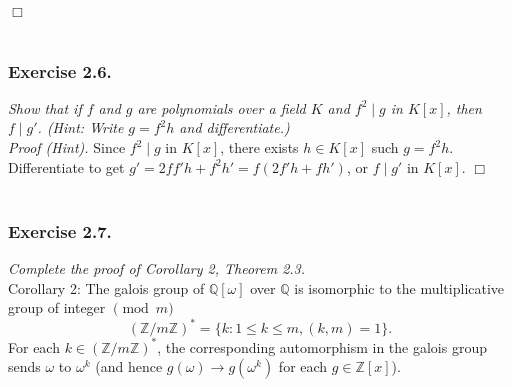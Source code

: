 \documentclass{article}
\begin{document}
$\Box$ \\\\






\subsubsection*{Exercise 2.6.}
\emph{Show that if $f$ and $g$ are polynomials over a field $K$ and
$f^2 \mid g$ in $K[x]$, then $f \mid g'$.
(Hint: Write $g = f^2 h$ and differentiate.)} \\

\emph{Proof (Hint).}
Since $f^2 \mid g$ in $K[x]$, there exists $h \in K[x]$ such $g = f^2 h$.
Differentiate to get $g' = 2f f' h + f^2 h' = f(2f'h + fh')$,
or $f \mid g'$ in $K[x]$.
$\Box$ \\\\






\subsubsection*{Exercise 2.7.}
\emph{Complete the proof of Corollary 2, Theorem 2.3.} \\



Corollary 2: The galois group of $\mathbb{Q}[\omega]$ over $\mathbb{Q}$ is isomorphic to
the multiplicative group of integer $\pmod m$
\[
  (\mathbb{Z}/m\mathbb{Z})^{*} = \{ k : 1 \leq k \leq m, (k,m) = 1\}.
\]
For each $k \in (\mathbb{Z}/m\mathbb{Z})^{*}$,
the corresponding automorphism in the galois group sends $\omega$ to $\omega^k$
(and hence $g(\omega) \to g(\omega^k)$ for each $g \in \mathbb{Z}[x]$). \\
\end{document}

